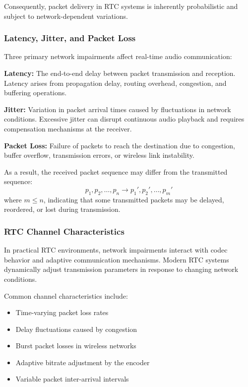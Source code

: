 Consequently, packet delivery in RTC systems is inherently probabilistic and subject to network-dependent variations.

\subsubsection{Latency, Jitter, and Packet Loss}

Three primary network impairments affect real-time audio communication:

\textbf{Latency:} The end-to-end delay between packet transmission and reception. Latency arises from propagation delay, routing overhead, congestion, and buffering operations.

\textbf{Jitter:} Variation in packet arrival times caused by fluctuations in network conditions. Excessive jitter can disrupt continuous audio playback and requires compensation mechanisms at the receiver.

\textbf{Packet Loss:} Failure of packets to reach the destination due to congestion, buffer overflow, transmission errors, or wireless link instability.

As a result, the received packet sequence may differ from the transmitted sequence:
\begin{equation}
{p_1,p_2,\ldots,p_n}
\rightarrow
{p_1',p_2',\ldots,p_m'}
\label{eq:packet_loss_model}
\end{equation}
where $m \leq n$, indicating that some transmitted packets may be delayed, reordered, or lost during transmission.

\subsubsection{RTC Channel Characteristics}

In practical RTC environments, network impairments interact with codec behavior and adaptive communication mechanisms. Modern RTC systems dynamically adjust transmission parameters in response to changing network conditions.

Common channel characteristics include:

\begin{itemize}
\item Time-varying packet loss rates
\item Delay fluctuations caused by congestion
\item Burst packet losses in wireless networks
\item Adaptive bitrate adjustment by the encoder
\item Variable packet inter-arrival intervals
\end{itemize}

